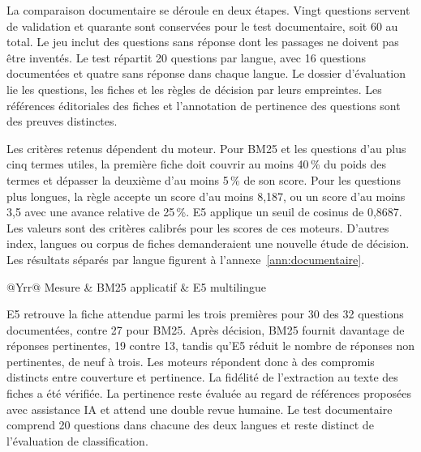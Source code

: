 La comparaison documentaire se déroule en deux étapes. Vingt questions servent de validation et quarante sont conservées pour le test documentaire, soit 60 au total. Le jeu inclut des questions sans réponse dont les passages ne doivent pas être inventés. Le test répartit 20 questions par langue, avec 16 questions documentées et quatre sans réponse dans chaque langue. Le dossier d’évaluation lie les questions, les fiches et les règles de décision par leurs empreintes. Les références éditoriales des fiches et l’annotation de pertinence des questions sont des preuves distinctes.

Les critères retenus dépendent du moteur. Pour BM25 et les questions d’au plus cinq termes utiles, la première fiche doit couvrir au moins 40\,\% du poids des termes et dépasser la deuxième d’au moins 5\,\% de son score. Pour les questions plus longues, la règle accepte un score d’au moins 8,187, ou un score d’au moins 3,5 avec une avance relative de 25\,\%. E5 applique un seuil de cosinus de 0,8687. Les valeurs sont des critères calibrés pour les scores de ces moteurs. D’autres index, langues ou corpus de fiches demanderaient une nouvelle étude de décision. Les résultats séparés par langue figurent à l’annexe~\ref{ann:documentaire}.

\begin{table}[htbp]
\centering\small
\caption{Test documentaire de 40 questions. Références de pertinence provisoires.}\label{tab:rag}
\begin{tabularx}{\linewidth}{@{}Yrr@{}}
\toprule
Mesure & BM25 applicatif & E5 multilingue \\
\midrule
{}
\bottomrule
\end{tabularx}
\end{table}

E5 retrouve la fiche attendue parmi les trois premières pour 30 des 32 questions documentées, contre 27 pour BM25. Après décision, BM25 fournit davantage de réponses pertinentes, 19 contre 13, tandis qu’E5 réduit le nombre de réponses non pertinentes, de neuf à trois. Les moteurs répondent donc à des compromis distincts entre couverture et pertinence. La fidélité de l’extraction au texte des fiches a été vérifiée. La pertinence reste évaluée au regard de références proposées avec assistance IA et attend une double revue humaine. Le test documentaire comprend 20 questions dans chacune des deux langues et reste distinct de l’évaluation de classification.
\FloatBarrier
